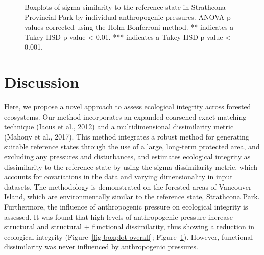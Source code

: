 \documentclass[
]{agujournal2019}
\begin{document}
\label{cell-fig-boxplot-individual}
\begin{figure}[H]


\caption{\label{fig-boxplot-individual}Boxplots of sigma similarity to
the reference state in Strathcona Provincial Park by individual
anthropogenic pressures. ANOVA p-values corrected using the
Holm-Bonferroni method. ** indicates a Tukey HSD p-value \textless{}
0.01. *** indicates a Tukey HSD p-value \textless{} 0.001.}

\end{figure}%

\section{Discussion}\label{discussion}

Here, we propose a novel approach to assess ecological integrity across
forested ecosystems. Our method incorporates an expanded coarsened exact
matching technique (Iacus et al., 2012) and a multidimensional
dissimilarity metric (Mahony et al., 2017). This method integrates a
robust method for generating suitable reference states through the use
of a large, long-term protected area, and excluding any pressures and
disturbances, and estimates ecological integrity as dissimilarity to the
reference state by using the sigma dissimilarity metric, which accounts
for covariations in the data and varying dimensionality in input
datasets. The methodology is demonstrated on the forested areas of
Vancouver Island, which are environmentally similar to the reference
state, Strathcona Park. Furthermore, the influence of anthropogenic
pressure on ecological integrity is assessed. It was found that high
levels of anthropogenic pressure increase structural and structural +
functional dissimilarity, thus showing a reduction in ecological
integrity (Figure~\ref{fig-boxplot-overall};
Figure~\ref{fig-boxplot-individual}). However, functional dissimilarity
was never influenced by anthropogenic pressures.
\end{document}
